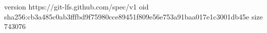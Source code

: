 version https://git-lfs.github.com/spec/v1
oid sha256:cb3a485c0ab3fffbd9f75980cce89451f809e56e753a91baa017e1c3001db45e
size 743076

